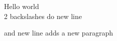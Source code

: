 \documentclass{article} %
\begin{document}
Hello world\\
2 backslashes do new line

and new line adds a new paragraph
\end{document}
